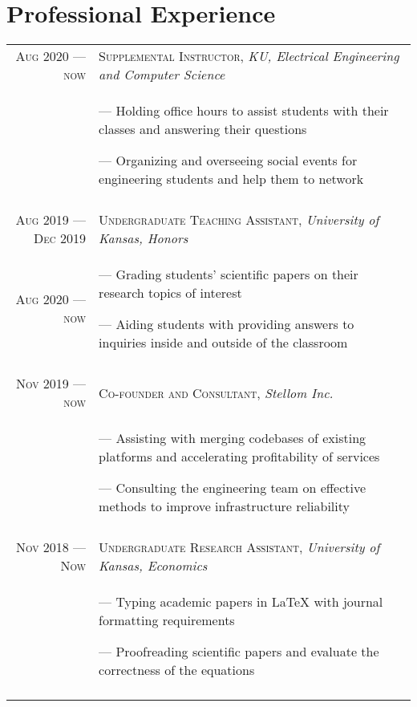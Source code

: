 \documentclass[letterpaper, 10pt]{article}
\begin{document}
\section{Professional Experience}
\begin{tabular}{r|p{12cm}}

	\textsc{Aug 2020 --- now}      & \textsc{Supplemental Instructor}, \emph{KU, Electrical Engineering and Computer Science}    \\&\footnotesize{
		--- Holding office hours to assist students with their classes and answering their questions

		--- Organizing and overseeing social events for engineering students and help them to network}                               \\\multicolumn{2}{c}{}\\

	\textsc{Aug 2019 --- Dec 2019} & \textsc{Undergraduate Teaching Assistant}, \emph{University of Kansas, Honors}              \\ \textsc{Aug 2020 --- now} &\footnotesize{
		--- Grading students' scientific papers on their research topics of interest

		--- Aiding students with providing answers to inquiries inside and outside of the classroom
	}                                                                                                                            \\\multicolumn{2}{c}{}\\

	\textsc{Nov 2019 --- now}      & \textsc{Co-founder and Consultant}, \emph{Stellom Inc.}                                     \\&\footnotesize{
		--- Assisting with merging codebases of existing platforms and accelerating profitability of services

		--- Consulting the engineering team on effective methods to improve infrastructure reliability
	}                                                                                                                            \\\multicolumn{2}{c}{}\\

	\textsc{Nov 2018 --- Now}      & \textsc{Undergraduate Research Assistant}, \emph{University of Kansas, Economics}           \\&\footnotesize{
		--- Typing academic papers in \LaTeX{} with journal formatting requirements

		--- Proofreading scientific papers and evaluate the correctness of the equations
	}                                                                                                                            \\\multicolumn{2}{c}{}\\


\end{tabular}
\end{document}
